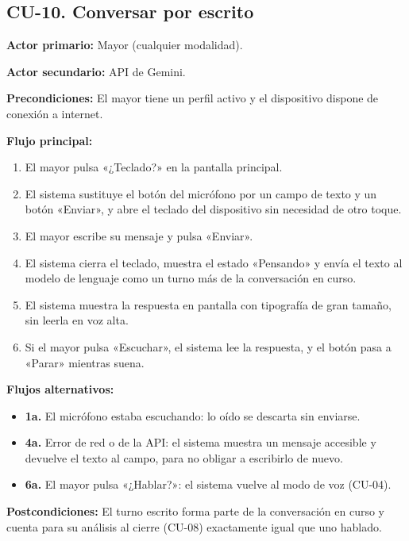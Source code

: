 \bigskip

\subsection*{CU-10. Conversar por escrito}

\noindent\textbf{Actor primario:} Mayor (cualquier modalidad).

\noindent\textbf{Actor secundario:} API de Gemini.

\noindent\textbf{Precondiciones:} El mayor tiene un perfil activo y el dispositivo dispone de conexión a
internet.

\noindent\textbf{Flujo principal:}
\begin{enumerate}[nosep]
    \item El mayor pulsa «¿Teclado?» en la pantalla principal.
    \item El sistema sustituye el botón del micrófono por un campo de texto y un botón «Enviar», y abre el
    teclado del dispositivo sin necesidad de otro toque.
    \item El mayor escribe su mensaje y pulsa «Enviar».
    \item El sistema cierra el teclado, muestra el estado «Pensando» y envía el texto al modelo de lenguaje
    como un turno más de la conversación en curso.
    \item El sistema muestra la respuesta en pantalla con tipografía de gran tamaño, sin leerla en voz alta.
    \item Si el mayor pulsa «Escuchar», el sistema lee la respuesta, y el botón pasa a «Parar» mientras
    suena.
\end{enumerate}

\noindent\textbf{Flujos alternativos:}
\begin{itemize}[nosep]
    \item \textbf{1a.} El micrófono estaba escuchando: lo oído se descarta sin enviarse.
    \item \textbf{4a.} Error de red o de la API: el sistema muestra un mensaje accesible y devuelve el texto
    al campo, para no obligar a escribirlo de nuevo.
    \item \textbf{6a.} El mayor pulsa «¿Hablar?»: el sistema vuelve al modo de voz (CU-04).
\end{itemize}

\noindent\textbf{Postcondiciones:} El turno escrito forma parte de la conversación en curso y cuenta para su
análisis al cierre (CU-08) exactamente igual que uno hablado.

